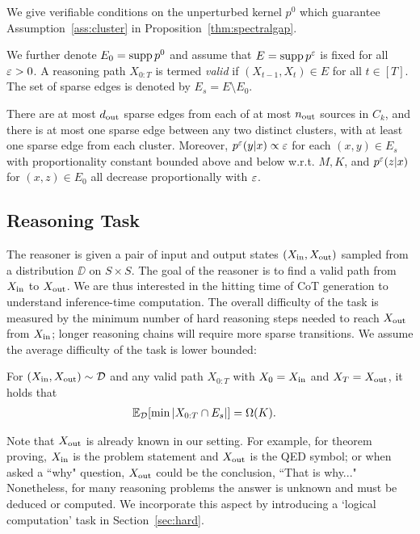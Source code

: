 We give verifiable conditions on the unperturbed kernel $p^0$ which guarantee Assumption~\ref{ass:cluster} in Proposition~\ref{thm:spectralgap}.

We further denote $E_0=\operatorname{supp} p^0$ and assume that $E=\operatorname{supp} p^\varepsilon$ is fixed for all $\varepsilon>0$. A reasoning path $X_{0:T}$ is termed \emph{valid} if $(X_{t-1},X_t)\in E$ for all $t\in[T]$. The set of sparse edges is denoted by $E_s=E\setminus E_0$. 

\begin{ass}\label{ass:sparse}
There are at most $d_{\operatorname{out}}$ sparse edges from each of at most $n_{\operatorname{out}}$ sources in $C_k$, and there is at most one sparse edge between any two distinct clusters, with at least one sparse edge from each cluster. Moreover, $p^\varepsilon(y|x)\propto\varepsilon$ for each $(x,y)\in E_s$ with proportionality constant bounded above and below w.r.t. $M,K$, and $p^\varepsilon(z|x)$ for $(x,z)\in E_0$ all decrease proportionally with $\varepsilon$.
\end{ass}

\subsection{Reasoning Task}

The reasoner is given a pair of input and output states $(X_{\operatorname{in}},X_{\operatorname{out}})$ sampled from a distribution $\DD$ on $S\times S$. The goal of the reasoner is to find a valid path from $X_{\operatorname{in}}$ to $X_{\operatorname{out}}$. We are thus interested in the hitting time of CoT generation to understand inference-time computation. The overall difficulty of the task is measured by the minimum number of hard reasoning steps needed to reach $X_{\operatorname{out}}$ from $X_{\operatorname{in}}$;  longer reasoning chains will require more sparse transitions. We assume the average difficulty of the task is lower bounded:

\begin{ass}\label{ass:sep}
For $(X_{\operatorname{in}},X_{\operatorname{out}})\sim\mathcal{D}$ and any valid path $X_{0:T}$ with $X_0=X_{\operatorname{in}}$ and $X_T=X_{\operatorname{out}}$, it holds that
\begin{align*}
&\mathbb{E}_{\mathcal{D}}[\min\left\lvert X_{0:T}\cap E_s\right\rvert] =\Omega(K).
\end{align*}
\end{ass}

Note that $X_{\operatorname{out}}$ is already known in our setting. For example, for theorem proving, $X_{\operatorname{in}}$ is the problem statement and $X_{\operatorname{out}}$ is the QED symbol; or when asked a ``why" question, $X_{\operatorname{out}}$ could be the conclusion, ``That is why..." Nonetheless, for many reasoning problems the answer is unknown and must be deduced or computed. We incorporate this aspect by introducing a `logical computation' task in Section~\ref{sec:hard}.


